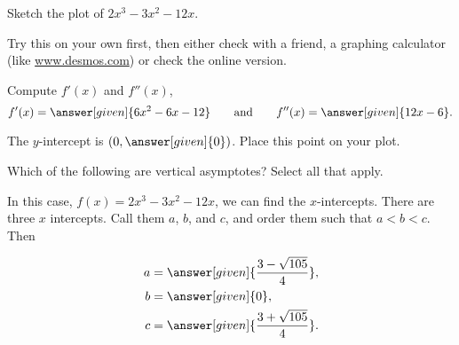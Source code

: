 \documentclass{ximera}
\begin{document}
\begin{example}
Sketch the plot of $2x^3-3x^2-12x$.
\begin{explanation}

 Try this on your own first, then either check with a friend, a graphing calculator (like \href{www.desmos.com}{www.desmos.com}) or check the online version.

\begin{hint}
Compute $f'(x)$ and $f''(x)$,
\[
f'(x) = \answer[given]{6x^2 -6x -12}\qquad\text{and}\qquad f''(x) = \answer[given]{12x-6}.
\]
\end{hint}

\begin{hint}
The $y$-intercept is $(0,\answer[given]{0})$. Place this point on your plot.
\begin{image}
\end{image}
\end{hint}

\begin{hint}
Which of the following are vertical asymptotes?  Select all that apply.

\begin{selectAll}
\end{selectAll}
\end{hint}

\begin{hint}
In this case, $f(x) =2x^3-3x^2-12x$, we can find the
$x$-intercepts.   There are three $x$ intercepts.  Call them $a$, $b$, and $c$, and order them such that $a<b<c$.  Then

\begin{align*}
  a &= \answer[given]{\frac{3-\sqrt{105}}{4}},\\
  b &= \answer[given]{0}, \\
  c &= \answer[given]{\frac{3+\sqrt{105}}{4}}.
\end{align*}
\end{hint}


\end{explanation}
\end{example}
\end{document}
